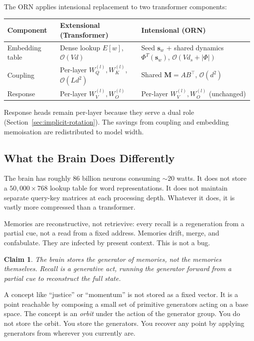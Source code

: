 \documentclass[11pt, a4paper]{article}
\newcommand{\M}{\mathbf{M}}
\newcommand{\s}{\mathbf{s}}
\newcommand{\bigO}{\mathcal{O}}
\newtheorem{claim}{Claim}
\theoremstyle{remark}
\begin{document}
The ORN applies intensional replacement to two transformer components:

\begin{center}\small
\begin{tabular}{@{}p{3cm}p{4.5cm}p{4.5cm}@{}}
\toprule
\textbf{Component} & \textbf{Extensional (Transformer)} & \textbf{Intensional (ORN)} \\
\midrule
Embedding table & Dense lookup $E[w]$, $\bigO(Vd)$ & Seed $\s_w$ + shared dynamics $\Phi^T(\s_w)$, $\bigO(Vd_s + |\Phi|)$ \\
Coupling & Per-layer $W_Q^{(l)}, W_K^{(l)}$, $\bigO(Ld^2)$ & Shared $\M = AB^\top$, $\bigO(d^2)$ \\
Response & Per-layer $W_V^{(l)}, W_O^{(l)}$ & Per-layer $W_V^{(l)}, W_O^{(l)}$ (unchanged) \\
\bottomrule
\end{tabular}
\end{center}

Response heads remain per-layer because they serve a dual role (Section~\ref{sec:implicit-rotation}).
The savings from coupling and embedding memoisation are redistributed to model width.


\subsection{What the Brain Does Differently}

The brain has roughly 86 billion neurons consuming ${\sim}20$ watts.
It does not store a $50{,}000 \times 768$ lookup table for word representations.
It does not maintain separate query-key matrices at each processing depth.
Whatever it does, it is vastly more compressed than a transformer.

Memories are reconstructive, not retrievive: every recall is a regeneration from a partial cue, not a read from a fixed address.
Memories drift, merge, and confabulate.
They are infected by present context.
This is not a bug.

\begin{claim}
The brain stores the \emph{generator} of memories, not the memories themselves.
Recall is a generative act, running the generator forward from a partial cue to reconstruct the full state.
\end{claim}

A concept like ``justice'' or ``momentum'' is not stored as a fixed vector.
It is a point reachable by composing a small set of primitive generators acting on a base space.
The concept is an \emph{orbit} under the action of the generator group.
You do not store the orbit.
You store the generators.
You recover any point by applying generators from wherever you currently are.
\end{document}
